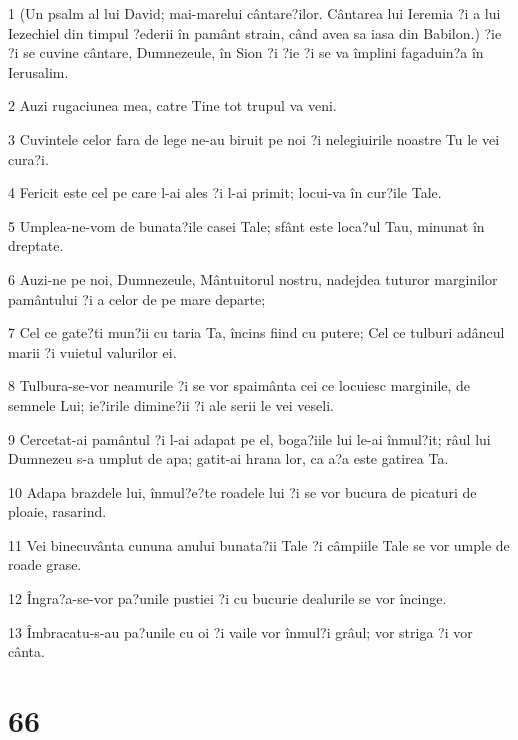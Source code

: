 \par 1 (Un psalm al lui David; mai-marelui cântare?ilor. Cântarea lui Ieremia ?i a lui Iezechiel din timpul ?ederii în pamânt strain, când avea sa iasa din Babilon.) ?ie ?i se cuvine cântare, Dumnezeule, în Sion ?i ?ie ?i se va împlini fagaduin?a în Ierusalim.
\par 2 Auzi rugaciunea mea, catre Tine tot trupul va veni.
\par 3 Cuvintele celor fara de lege ne-au biruit pe noi ?i nelegiuirile noastre Tu le vei cura?i.
\par 4 Fericit este cel pe care l-ai ales ?i l-ai primit; locui-va în cur?ile Tale.
\par 5 Umplea-ne-vom de bunata?ile casei Tale; sfânt este loca?ul Tau, minunat în dreptate.
\par 6 Auzi-ne pe noi, Dumnezeule, Mântuitorul nostru, nadejdea tuturor marginilor pamântului ?i a celor de pe mare departe;
\par 7 Cel ce gate?ti mun?ii cu taria Ta, încins fiind cu putere; Cel ce tulburi adâncul marii ?i vuietul valurilor ei.
\par 8 Tulbura-se-vor neamurile ?i se vor spaimânta cei ce locuiesc marginile, de semnele Lui; ie?irile dimine?ii ?i ale serii le vei veseli.
\par 9 Cercetat-ai pamântul ?i l-ai adapat pe el, boga?iile lui le-ai înmul?it; râul lui Dumnezeu s-a umplut de apa; gatit-ai hrana lor, ca a?a este gatirea Ta.
\par 10 Adapa brazdele lui, înmul?e?te roadele lui ?i se vor bucura de picaturi de ploaie, rasarind.
\par 11 Vei binecuvânta cununa anului bunata?ii Tale ?i câmpiile Tale se vor umple de roade grase.
\par 12 Îngra?a-se-vor pa?unile pustiei ?i cu bucurie dealurile se vor încinge.
\par 13 Îmbracatu-s-au pa?unile cu oi ?i vaile vor înmul?i grâul; vor striga ?i vor cânta.

\chapter{66}

